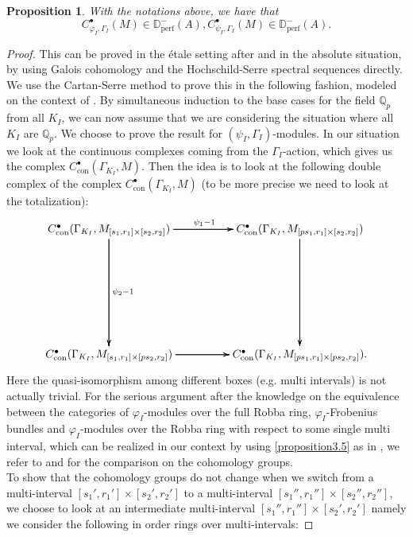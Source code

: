 \documentclass[12pt]{amsart}
\newtheorem{proposition}[theorem]{Proposition}
\theoremstyle{definition}
\numberwithin{equation}{section}
\begin{document}
\begin{proposition} \label{proposition4.9}
With the notations above, we have that 
\begin{displaymath}
C^\bullet_{\varphi_I,\Gamma_{I}}(M)\in \mathbb{D}_\mathrm{perf}^-(A), C^\bullet_{\psi_I,\Gamma_{I}}(M)\in \mathbb{D}_\mathrm{perf}^-(A).
\end{displaymath}
\end{proposition}

\begin{proof}
This can be proved in the \'etale setting after \cite{PZ19} and \cite{CKZ18} in the absolute situation, by using Galois cohomology and the Hochschild-Serre spectral sequences directly. We use the Cartan-Serre method to prove this in the following fashion, modeled on the context of \cite{KL3}. By simultaneous induction to the base cases for the field $\mathbb{Q}_p$ from all $K_I$, we can now assume that we are considering the situation where all $K_I$ are $\mathbb{Q}_p$. We choose to prove the result for $(\psi_I,\Gamma_I)$-modules. In our situation we look at the continuous complexes coming from the  $\Gamma_I$-action, which gives us the complex $C^\bullet_{\mathrm{con}}(\Gamma_{K_I},M)$. Then the idea is to look at the following double complex of the complex $C^\bullet_{\mathrm{con}}(\Gamma_{K_I},M)$ (to be more precise we need to look at the totalization):
\[
\xymatrix@R+6pc@C+2pc{
C^\bullet_{\mathrm{con}}(\Gamma_{K_I},M_{[s_1,r_1]\times[s_2,r_2]}) \ar[r]^{\psi_1-1} \ar[r] \ar[r] \ar[d]^{\psi_2-1} \ar[d] \ar[d] & C^\bullet_{\mathrm{con}}(\Gamma_{K_I},M_{[ps_1,r_1]\times[s_2,r_2]}) \ar[d] \ar[d] \ar[d]\\
C^\bullet_{\mathrm{con}}(\Gamma_{K_I},M_{[s_1,r_1]\times[ps_2,r_2]})\ar[r] \ar[r] \ar[r]  &C^\bullet_{\mathrm{con}}(\Gamma_{K_I},M_{[ps_1,r_1]\times[ps_2,r_2]}). 
}
\]
Here the quasi-isomorphism among different boxes (e.g. multi intervals) is not actually trivial. For the serious argument after the knowledge on the equivalence between the categories of $\varphi_I$-modules over the full Robba ring, $\varphi_I$-Frobenius bundles and $\varphi_I$-modules over the Robba ring with respect to some single multi interval, which can be realized in our context by using \cref{proposition3.5} as in \cite[Lemma 2.10]{KP1}, we refer to \cite[Lemma 5.2]{KP1} and \cite[Proposition 5.12, Theorem 5.7.11]{KL2} for the comparison on the cohomology groups. \\
\indent To show that the cohomology groups do not change when we switch from a multi-interval $[s_1',r_1']\times [s_2',r_2']$ to a multi-interval $[s_1'',r_1'']\times [s_2'',r_2'']$, we choose to look at an intermediate multi-interval $[s_1'',r_1'']\times [s_2',r_2']$ namely we consider the following in order rings over multi-intervals:

\end{proof}
\end{document}
